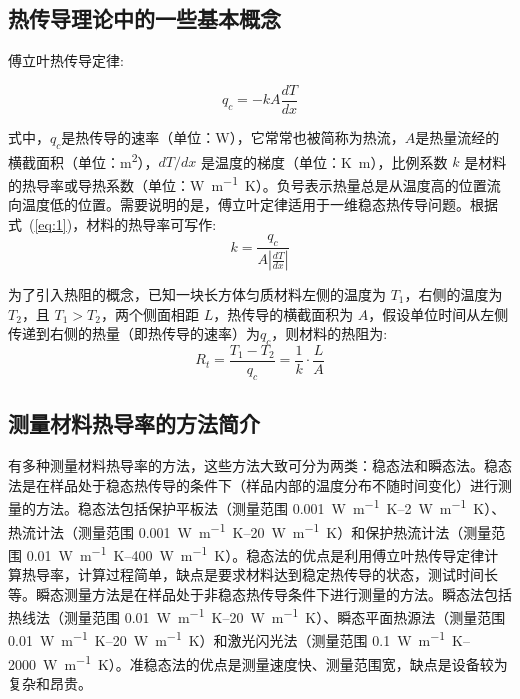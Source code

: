 \documentclass[a4paper,utf8]{article}
\newcommand{\seqref}[1]{式~(\ref{#1})}
\newcommand{\qrange}[3]{\qtyrange[range-phrase = \text{$\sim$},range-units =single]{#1}{#2}{#3}}
\begin{document}
    \subsection{热传导理论中的一些基本概念}
        傅立叶热传导定律:\par
        \begin{equation}
            q_c=-kA\frac{dT}{dx} \label{eq:1}
        \end{equation} \par
        式中，$q_c$是热传导的速率（单位：\unit{\watt}），它常常也被简称为热流，$A$是热量流经的横截面积（单位：\unit{\meter\squared}），$dT/dx$ 是温度的梯度（单位：\unit{\kelvin\metre}），比例系数 $k$ 是材料的热导率或导热系数（单位：\unit{\watt\per\meter\kelvin}）。负号表示热量总是从温度高的位置流向温度低的位置。需要说明的是，傅立叶定律适用于一维稳态热传导问题。根据\seqref{eq:1}，材料的热导率可写作:
        \begin{equation}
            k=\frac{q_c}{A \displaystyle \left|\frac{dT}{dx}\right|} \label{eq:2}
        \end{equation} \par
        为了引入热阻的概念，已知一块长方体匀质材料左侧的温度为 $T_1$，右侧的温度为 $T_2$，且 $T_1 > T_2$，两个侧面相距 $L$，热传导的横截面积为 $A$，假设单位时间从左侧传递到右侧的热量（即热传导的速率）为$q_c$，则材料的热阻为:
        \begin{equation}
            R_t=\frac{T_1-T_2}{q_c}=\frac{1}{k}\cdot\frac{L}{A} \label{eq:3}
        \end{equation} \par

    \subsection{测量材料热导率的方法简介}
        有多种测量材料热导率的方法，这些方法大致可分为两类：稳态法和瞬态法。稳态法是在样品处于稳态热传导的条件下（样品内部的温度分布不随时间变化）进行测量的方法。稳态法包括保护平板法（测量范围 \qrange{0.001}{2}{\watt\per\meter\kelvin}）、热流计法（测量范围 \qrange{0.001}{20}{\watt\per\meter\kelvin}）和保护热流计法（测量范围 \qrange{0.01}{400}{\watt\per\meter\kelvin}）。稳态法的优点是利用傅立叶热传导定律计算热导率，计算过程简单，缺点是要求材料达到稳定热传导的状态，测试时间长等。瞬态测量方法是在样品处于非稳态热传导条件下进行测量的方法。瞬态法包括热线法（测量范围 \qrange{0.01}{20}{\watt\per\meter\kelvin}）、瞬态平面热源法（测量范围 \qrange{0.01}{20}{\watt\per\meter\kelvin}）和激光闪光法（测量范围 \qrange{0.1}{2000}{\watt\per\meter\kelvin}）。准稳态法的优点是测量速度快、测量范围宽，缺点是设备较为复杂和昂贵。
\end{document}
